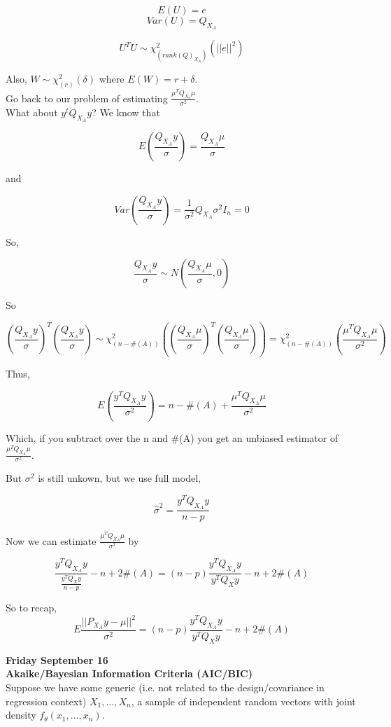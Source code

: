 \documentclass[11pt,fleqn]{book} %
\begin{document}
$$E(U) = e $$
$$Var(U) = Q_{X_A} $$

$$U^TU \sim \chi^2_{(rank(Q)_{X_A})} (||e||^2) $$

Also, $W \sim \chi^2_{(r)} (\delta)$ where $E(W) = r + \delta$.\\

Go back to our problem of estimating $\frac{\mu^T Q_{X_a} \mu}{\sigma^2}$. \\

What about $y^t Q_{X_A} y$? We know that

$$E (\frac{Q_{X_A}y}{\sigma}) = \frac{Q_{X_A}\mu}{\sigma}$$

and

$$Var(\frac{Q_{X_A}y}{\sigma}) = \frac{1}{\sigma^2} Q_{X_A}\sigma^2 I_n = 0$$

So, 

$$ \frac{Q_{X_A}y}{\sigma} \sim N( \frac{Q_{X_A}\mu}{\sigma}, 0)$$

So

$$(\frac{Q_{X_A}y}{\sigma})^T(\frac{Q_{X_A}y}{\sigma}) \sim \chi^2_{(n-\#(A))} ((\frac{Q_{X_A}\mu}{\sigma})^T(\frac{Q_{X_A}\mu}{\sigma})) = \chi^2_{(n-\#(A))} (\frac{\mu^T Q_{X_A} \mu}{\sigma^2}) $$

Thus, 

$$E(\frac{y^T Q_{X_A} y}{\sigma^2} ) = n - \#(A) + \frac{\mu^T Q_{X_A} \mu}{\sigma^2} $$

Which, if you subtract over the n and \#(A) you get an unbiased estimator of $\frac{\mu^T Q_{X_A} \mu}{\sigma^2}$.

But $\sigma^2$ is still unkown, but we use full model, 

$$\hat{\sigma}^2 = \frac{y^T Q_{X_A} y}{n - p} $$

Now we can estimate $\frac{\mu^T Q_{X_A} \mu}{\sigma^2} $ by 

$$\frac{y^T Q_{X_A} y}{\frac{y^T Q_{X} y}{n-p}} - n + 2\#(A) = (n-p) \frac{y^T Q_{X_A} y}{y^T Q_{X} y} - n + 2 \#(A)$$ 

So to recap,
 $$ E\frac{ || P_{X_A} y - \mu ||^2}{\sigma^2} = (n-p)\frac{y^T Q_{X_A} y}{y^T Q_{X} y} - n + 2 \#(A) $$


\textbf{Friday September 16}\\


\textbf{Akaike/Bayesian Information Criteria (AIC/BIC)}\\

Suppose we have some generic (i.e. not related to the design/covariance in regression context) $X_1, \dots, X_n$, a sample of independent random vectors with joint density $f_\theta (x_1, \dots, x_n)$.\\
\end{document}
